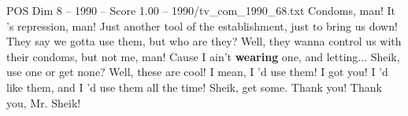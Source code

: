 \begin{textsample}{POS Dim 8 – 1990 – Score 1.00 – 1990/tv\_com\_1990\_68.txt}  \label{ex:f8_pos_077}
Condoms, man!
It 's repression, man!
Just another tool of the establishment, just to bring us down!
They say we gotta use them, but who are they?
Well, they wanna control us with their condoms, but not me, man!
Cause I ain't \textbf{wearing} one, and letting...
Sheik, use one or get none?
Well, these are cool!
I mean, I 'd use them!
I got you!
I 'd like them, and I 'd use them all the time!
Sheik, get some.
Thank you!
Thank you, Mr.
Sheik!

\end{textsample}
